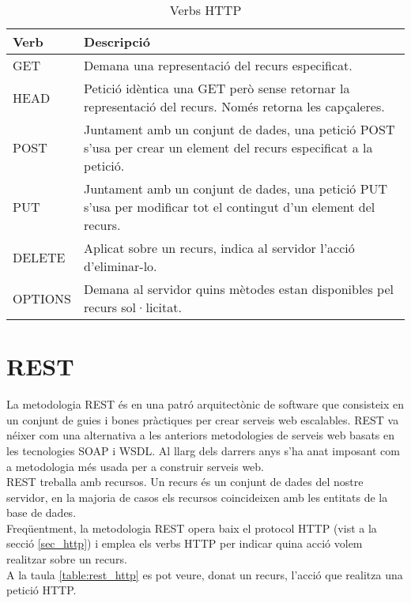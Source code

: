 \begin{table}[h!]
 	\begin{center}
 		\begin{tabularx}{\textwidth}{|l|X|}
  			\hline
 			\bfseries Verb & \bfseries Descripció \\ \hline
			GET &  Demana una representació del recurs especificat. \\ \hline
			HEAD & Petició idèntica una GET però sense retornar la representació del recurs. Només retorna les capçaleres.\\ \hline
			POST & Juntament amb un conjunt de dades, una petició POST s'usa per crear un element del recurs especificat a la petició.\\ \hline
			PUT & Juntament amb un conjunt de dades, una petició PUT s'usa per modificar tot el contingut d'un element del recurs.\\ \hline
			DELETE & Aplicat sobre un recurs, indica al servidor l'acció d'eliminar-lo.\\ \hline
			OPTIONS & Demana al servidor quins mètodes estan disponibles pel recurs sol·licitat.\\ \hline
		\end{tabularx}
	\end{center}
	\label{table:verbs_http}
	\caption{Verbs \ac{HTTP}} 
\end{table}
\section{\ac{REST}}
La metodologia \ac{REST} és en una patró arquitectònic de software que consisteix en un conjunt de guies i bones pràctiques per crear serveis web escalables. \ac{REST} va néixer com una alternativa a les anteriors metodologies de serveis web basats en les tecnologies \ac{SOAP} i \ac{WSDL}. Al llarg dels darrers anys s'ha anat imposant com a metodologia més usada per a construir serveis web.\\

\ac{REST} treballa amb recursos. Un recurs és un conjunt de dades del nostre servidor, en la majoria de casos els recursos coincideixen amb les entitats de la base de dades.\\

Freqüentment, la metodologia \ac{REST} opera baix el protocol \ac{HTTP} (vist a la secció \ref{sec_http}) i emplea els verbs \ac{HTTP} per indicar quina acció volem realitzar sobre un recurs.\\

A la taula \ref{table:rest_http} es pot veure, donat un recurs, l'acció que realitza una petició \ac{HTTP}.

